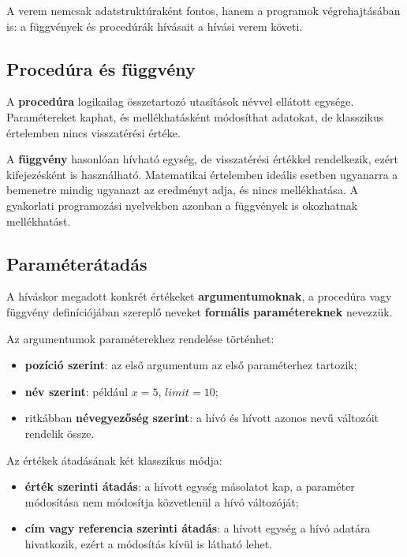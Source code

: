 

A verem nemcsak adatstruktúraként fontos, hanem a programok végrehajtásában is: a függvények és procedúrák hívásait a hívási verem követi.

\subsection{Procedúra és függvény}

A \textbf{procedúra} logikailag összetartozó utasítások névvel ellátott egysége. Paramétereket kaphat, és mellékhatásként módosíthat adatokat, de klasszikus értelemben nincs visszatérési értéke.

A \textbf{függvény} hasonlóan hívható egység, de visszatérési értékkel rendelkezik, ezért kifejezésként is használható. Matematikai értelemben ideális esetben ugyanarra a bemenetre mindig ugyanazt az eredményt adja, és nincs mellékhatása. A gyakorlati programozási nyelvekben azonban a függvények is okozhatnak mellékhatást.

\begin{center}

\end{center}

\subsection{Paraméterátadás}

A híváskor megadott konkrét értékeket \textbf{argumentumoknak}, a procedúra vagy függvény definíciójában szereplő neveket \textbf{formális paramétereknek} nevezzük.

Az argumentumok paraméterekhez rendelése történhet:

\begin{itemize}
  \item \textbf{pozíció szerint}: az első argumentum az első paraméterhez tartozik;
  \item \textbf{név szerint}: például $x=5$, $limit=10$;
  \item ritkábban \textbf{névegyezőség szerint}: a hívó és hívott azonos nevű változóit rendelik össze.
\end{itemize}

Az értékek átadásának két klasszikus módja:

\begin{itemize}
  \item \textbf{érték szerinti átadás}: a hívott egység másolatot kap, a paraméter módosítása nem módosítja közvetlenül a hívó változóját;
  \item \textbf{cím vagy referencia szerinti átadás}: a hívott egység a hívó adatára hivatkozik, ezért a módosítás kívül is látható lehet.
\end{itemize}

